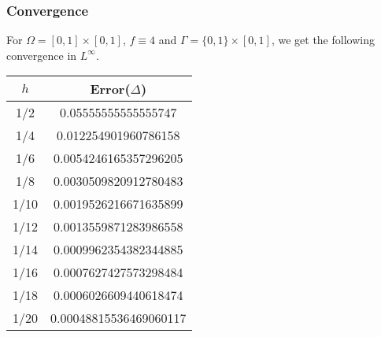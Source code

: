 \documentclass{beamer}
\begin{document}
\begin{frame}
\frametitle{Convergence}
For $\Omega=[0,1]\times[0,1]$, $f\equiv 4$ and $\Gamma=\{0,1\}\times[0,1]$, we get the following convergence in $L^{\infty}$.
\linebreak\linebreak
\begin{tabular}{|c|c|}
\hline
$h$ & Error($\Delta$)  	\\ \hline
1/2	&		0.05555555555555747	 \\ \hline
1/4	&		0.012254901960786158 \\ \hline
1/6	&		0.0054246165357296205 \\ \hline
1/8	&		0.0030509820912780483 \\ \hline
1/10	&		0.0019526216671635899 \\ \hline
1/12	&		0.0013559871283986558 \\ \hline
1/14	&		0.0009962354382344885 \\ \hline
1/16	&		0.0007627427573298484 \\ \hline
1/18	&		0.0006026609440618474 \\ \hline
1/20	&		0.00048815536469060117 \\ \hline
\end{tabular}



\end{frame}
\end{document}
